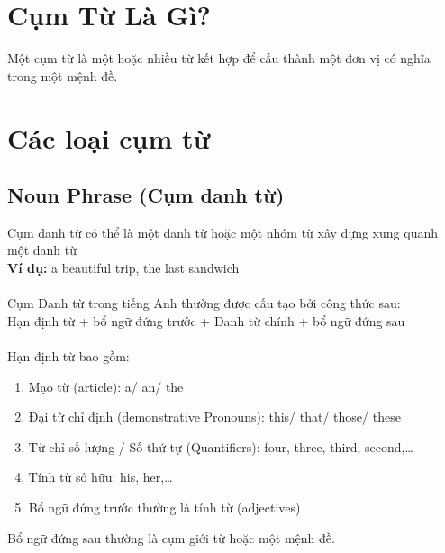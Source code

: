 
\chapter{Cụm Từ Là Gì?}
Một cụm từ là một hoặc nhiều từ kết hợp để cấu thành một đơn vị có nghĩa trong một mệnh đề.

\chapter{Các loại cụm từ}
\section{Noun Phrase (Cụm danh từ)}
Cụm danh từ có thể là một danh từ hoặc một nhóm từ xây dựng xung quanh một danh từ\\
\textbf{Ví dụ:} a beautiful trip, the last sandwich\\\\
Cụm Danh từ trong tiếng Anh thường được cấu tạo bởi công thức sau:\\
Hạn định từ + bổ ngữ đứng trước + Danh từ chính + bổ ngữ đứng sau\\\\

Hạn định từ bao gồm:
\begin{enumerate}
    \item Mạo từ (article): a/ an/ the
    \item Đại từ chỉ định (demonstrative Pronouns): this/ that/ those/ these
    \item Từ chỉ số lượng / Số thứ tự (Quantifiers): four, three, third, second,…
    \item Tính từ sở hữu: his, her,…
    \item Bổ ngữ đứng trước thường là tính từ (adjectives)
\end{enumerate}
Bổ ngữ đứng sau thường là cụm giới từ hoặc một mệnh đề.